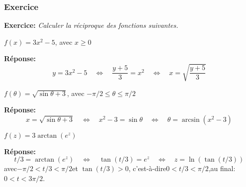 \begin{frame}[plain]
\frametitle{\bf Exercice}
\medskip 

{\bf Exercice:} 
{\em Calculer la r\'eciproque des fonctions suivantes.}
\vspace*{2mm}

\begin{itemize}
\bitem
$f(x)=3x^2-5$, avec $x\geq 0$
\end{itemize}
\vspace*{2mm}

\pause
{\bf R\'eponse:}\vspace*{-5mm} 
$$
y=3x^2-5 \quad\Leftrightarrow\quad 
\frac{y+5}{3}=x^2 \quad\Leftrightarrow\quad 
x=\sqrt{\frac{y+5}{3}}
$$

\pause
\begin{itemize}
\bitem
$f(\theta)=\sqrt{\sin\theta+3}$, avec $-\pi/2\leq \theta\leq \pi/2$
\end{itemize}
\vspace*{2mm}

\pause
{\bf R\'eponse:} \vspace*{-2mm} 
$$
x=\sqrt{\sin\theta+3} \quad\Leftrightarrow\quad 
x^2-3=\sin\theta \quad\Leftrightarrow\quad 
\theta=\arcsin(x^2-3)
$$

\pause
\begin{itemize}
\bitem
$f(z)=3\arctan(e^z)$ 
\end{itemize}
\vspace*{3mm}

\pause
{\bf R\'eponse:}  \vspace*{-2mm} 
$$ 
t/3=\arctan(e^z) \quad\Leftrightarrow\quad 
\tan(t/3)=e^z \quad\Leftrightarrow\quad 
z=\ln(\tan(t/3))
$$
avec\quad $-\pi/2<t/3<\pi/2$\quad et \quad $\tan(t/3)>0$,\quad 
c'est-\`a-dire\quad $0<t/3<\pi/2$,\quad au final:\quad $0<t<3\pi/2$.

\end{frame}


\begin{frame}
\end{frame}






